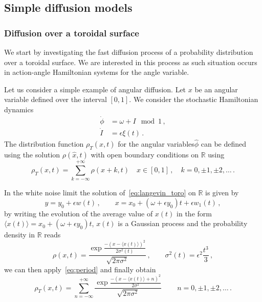 \subsection{Simple diffusion models}

\subsubsection*{Diffusion over a toroidal surface}

We start by investigating the fast diffusion process of a probability distribution over a toroidal surface. We are interested in this process as such situation occurs in action-angle Hamiltonian systems for the angle variable.

Let us consider a simple example of angular diffusion. Let \(x\) be an angular variable defined over the interval \([0,1]\). We consider the stochastic Hamiltonian dynamics
\begin{equation}
	\begin{aligned}
		\dot{\phi} &= \omega + I \mod{1}\,, \\
		\dot{I} &= \epsilon\xi(t)	\,.
	\end{aligned}
	\label{eq:langevin_toro}
\end{equation}
The distribution function \(\rho_T(\hat{x},t)\) for the angular variables\(\hat{\phi}\) can be defined using the solution  \(\rho(\hat{x},t)\) with open boundary conditions on \(\mathbb{R}\) using
\begin{equation}
	\rho_T(x,t) = \sum_{k=-\infty}^{+\infty} \rho(x+k,t) \quad x\in[0,1]\,,\quad k = 0,\pm 1, \pm 2, \ldots \,.
 \label{eq:period}
\end{equation}

In the white noise limit the solution of~\eqref{eq:langevin_toro} on \(\mathbb{R}\) is given by
\begin{equation}
	y = y_0 + \epsilon w(t)\,, \qquad x = x_0 + (\omega + \epsilon y_0) t + \epsilon w_1(t) \,,
\end{equation}
by writing the evolution of the average value of \(x(t)\) in the form \(\langle x(t) \rangle = x_0 + (\omega + \epsilon y_0) t\), $x(t)$ is a Gaussian process and the probability density in \(\mathbb{R}\) reads
\begin{equation}
	\rho(x,t) = \frac{\exp{\frac{-(x-\langle x(t)\rangle)^2}{2\sigma^2(t)}}}{\sqrt{2\pi\sigma^2}}\,, \qquad \sigma^2(t) = \epsilon^2 \frac{t^3}{3}\,,
\end{equation}
we can then apply~\eqref{eq:period} and finally obtain
\begin{equation}
	\rho_T(x,t) = \sum_{n=-\infty}^{+\infty} \frac{\exp{\frac{-(x-\langle x(t)\rangle + n)^2}{2\sigma^2}}}{\sqrt{2\pi\sigma^2}} \,\qquad n = 0,\pm 1, \pm 2, \ldots\,.
\end{equation}

